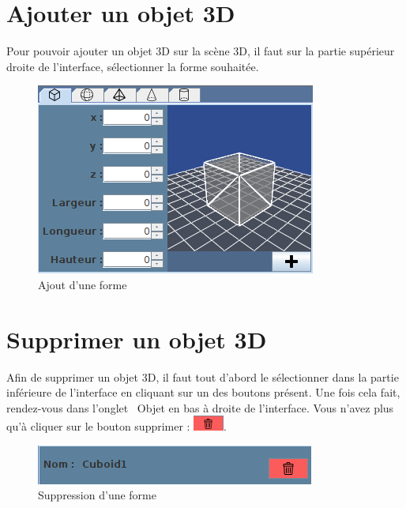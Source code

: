 \documentclass[11pt]{report}
\begin{document}
\section{Ajouter un objet 3D}
Pour pouvoir ajouter un objet 3D sur la scène 3D, il faut sur la partie supérieur droite de l'interface, sélectionner la forme souhaitée.
\newline


\begin{figure}[h]
  \centering
  \includegraphics[scale=0.75]{./ajoutFormes.png}
  \caption{Ajout d'une forme}
\end{figure}

\section{Supprimer un objet 3D}

Afin de supprimer un objet 3D, il faut tout d'abord le sélectionner dans la partie inférieure de l'interface en cliquant sur un des boutons
présent. Une fois cela fait, rendez-vous dans l'onglet \flqq\ Objet \frqq en bas à droite de l'interface. Vous n'avez plus qu'à cliquer sur le
bouton supprimer : \includegraphics[width=1cm]{./btn_supprimer.png}.

\begin{figure}[h]
  \centering
  \includegraphics{./supprimerForme.png}
  \caption{Suppression d'une forme}
\end{figure}
\end{document}
